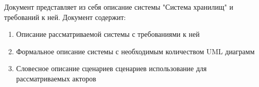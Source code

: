 Документ представляет из себя описание
системы "Система хранилищ" и требований к ней.
Документ содержит:

\begin{enumerate}
  \item Описание рассматриваемой системы с требованиями к ней
  \item Формальное описание системы с необходимым количеством
        UML диаграмм
  \item Словесное описание сценариев сценариев использование
        для рассматриваемых акторов
\end{enumerate}

